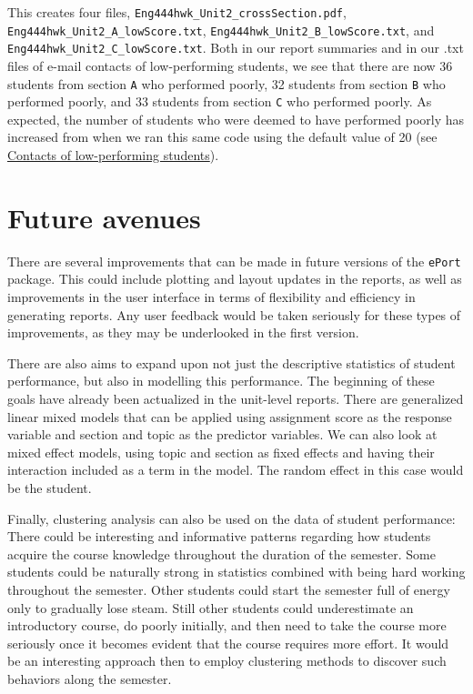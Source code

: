 \documentclass[11pt,a4paper,oldfontcommands,openany]{memoir}
\numberwithin{equation}{section} %
\begin{document}
This creates four files, \texttt{Eng444hwk\_Unit2\_crossSection.pdf}, \texttt{Eng444hwk\_Unit2\_A\_lowScore.txt}, \texttt{Eng444hwk\_Unit2\_B\_lowScore.txt}, and \texttt{Eng444hwk\_Unit2\_C\_lowScore.txt}. Both in our report summaries and in our .txt files of e-mail contacts of low-performing students, we see that there are now 36 students from section \texttt{A} who performed poorly, 32 students from section \texttt{B} who performed poorly, and 33 students from section \texttt{C} who performed poorly. As expected, the number of students who were deemed to have performed poorly has increased from when we ran this same code using the default value of 20 (see \hyperref[sec:lowPer]{Contacts of low-performing students}).

\chapter{Future avenues}

There are several improvements that can be made in future versions of the \texttt{ePort} package. This could include plotting and layout updates in the reports, as well as improvements in the user interface in terms of flexibility and efficiency in generating reports. Any user feedback would be taken seriously for these types of improvements, as they may be underlooked in the first version.

There are also aims to expand upon not just the descriptive statistics of student performance, but also in modelling this performance. The beginning of these goals have already been actualized in the unit-level reports. There are generalized linear mixed models that can be applied using assignment score as the response variable and section and topic as the predictor variables. We can also look at mixed effect models, using topic and section as fixed effects and having their interaction included as a term in the model. The random effect in this case would be the student.

Finally, clustering analysis can also be used on the data of student performance: There could be interesting and informative patterns regarding how students acquire the course knowledge throughout the duration of the semester. Some students could be naturally strong in statistics combined with being hard working throughout the semester. Other students could start the semester full of energy only to gradually lose steam. Still other students could underestimate an introductory course, do poorly initially, and then need to take the course more seriously once it becomes evident that the course requires more effort. It would be an interesting approach then to employ clustering methods to discover such behaviors along the semester.
\end{document}
